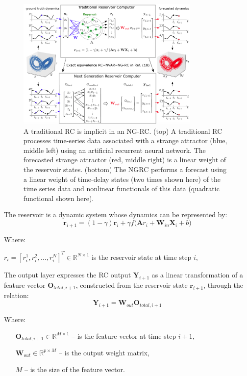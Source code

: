 \documentclass[11pt, oneside]{article}
\begin{document}
\begin{figure}[H]
    \centering
    \includegraphics[width=0.8\textwidth]{figs/next-generation.png}
    \caption{ A traditional RC is implicit in an NG-RC. (top) A traditional RC processes time-series data associated with a strange attractor (blue, middle left)
using an artificial recurrent neural network. The forecasted strange attractor (red, middle right) is a linear weight of the reservoir states. (bottom) The NGRC performs a forecast using a linear weight of time-delay states (two times shown here) of the time series data and nonlinear functionals of this data
(quadratic functional shown here).}
    \label{fig:ng-rc}
\end{figure}

The reservoir is a
dynamic system whose dynamics can be represented by:
\begin{equation}
    \mathbf{r}_{i+1} = (1 - \gamma) \mathbf{r}_i + \gamma f \big(\mathbf{A} r_i + \mathbf{W}_{in} \mathbf{X}_i + b \big)
\end{equation}

Where: 

\( r_i = [r_i^1, r_i^2, \ldots, r_i^N]^T \in \mathbb{R}^{N \times 1} \) is the reservoir state at time step \(i\),

The output layer expresses the RC output \(\mathbf{Y}_{i+1}\) as a linear
transformation of a feature vector \(\mathbf{O}_{total,i+1}\), constructed from the
reservoir state \(\mathbf{r}_{i+1}\), through the relation:
\begin{equation}
    \mathbf{Y}_{i+1} = \mathbf{W}_{out} \mathbf{O}_{total,i+1}
\end{equation}

Where:
\begin{itemize}[noitemsep, leftmargin=4cm, label={}]
    \item [\(\mathbf{O}_{total,i+1} \in \mathbb{R}^{M \times 1}\)] -- is the feature vector at time step \(i+1\),
    \item [\(\mathbf{W}_{out} \in \mathbb{R}^{p \times M}\)] -- is the output weight matrix,
    \item [\(M\)] -- is the size of the feature vector.
\end{itemize}
\end{document}
